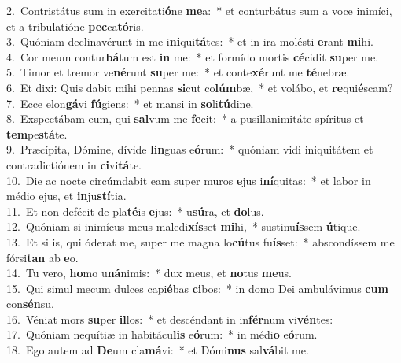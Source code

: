 {2.~}Contristátus sum in exercitati\textbf{ó}ne \textbf{me}a:~* et conturbátus sum a voce inimíci, et a tribulatióne \textbf{pec}ca\textbf{tó}ris.\\
{3.~}Quóniam declinavérunt in me i\textbf{ni}qui\textbf{tá}tes:~* et in ira molésti \textbf{e}rant \textbf{mi}hi.\\
{4.~}Cor meum contur\textbf{bá}tum est \textbf{in} me:~* et formído mortis \textbf{cé}cidit \textbf{su}per me.\\
{5.~}Timor et tremor ve\textbf{né}runt \textbf{su}per me:~* et conte\textbf{xé}runt me \textbf{té}nebræ.\\
{6.~}Et dixi: Quis dabit mihi pennas \textbf{si}cut co\textbf{lúm}bæ,~* et volábo, et \textbf{re}qui\textbf{é}scam?\\
{7.~}Ecce elon\textbf{gá}vi \textbf{fú}giens:~* et mansi in \textbf{so}li\textbf{tú}dine.\\
{8.~}Exspectábam eum, qui \textbf{sal}vum me \textbf{fe}cit:~* a pusillanimitáte spíritus et \textbf{tem}pe\textbf{stá}te.\\
{9.~}Præcípita, Dómine, dívide \textbf{lin}guas e\textbf{ó}rum:~* quóniam vidi iniquitátem et contradictiónem in \textbf{ci}vi\textbf{tá}te.\\
{10.~}Die ac nocte circúmdabit eam super muros \textbf{e}jus i\textbf{ní}quitas:~* et labor in médio ejus, et \textbf{in}ju\textbf{stí}tia.\\
{11.~}Et non defécit de pla\textbf{té}is \textbf{e}jus:~* u\textbf{sú}ra, et \textbf{do}lus.\\
{12.~}Quóniam si inimícus meus maledi\textbf{xís}set \textbf{mi}hi,~* sustinu\textbf{ís}sem \textbf{ú}tique.\\
{13.~}Et si is, qui óderat me, super me magna lo\textbf{cú}tus fu\textbf{ís}set:~* abscondíssem me fórsi\textbf{tan} ab \textbf{e}o.\\
{14.~}Tu vero, \textbf{ho}mo u\textbf{ná}nimis:~* dux meus, et \textbf{no}tus \textbf{me}us.\\
{15.~}Qui simul mecum dulces capi\textbf{é}bas \textbf{ci}bos:~* in domo Dei ambulávimus \textbf{cum} con\textbf{sén}su.\\
{16.~}Véniat mors \textbf{su}per \textbf{il}los:~* et descéndant in in\textbf{fér}num vi\textbf{vén}tes:\\
{17.~}Quóniam nequítiæ in habitácu\textbf{lis} e\textbf{ó}rum:~* in médi\textbf{o} e\textbf{ó}rum.\\
{18.~}Ego autem ad \textbf{De}um cla\textbf{má}vi:~* et Dómi\textbf{nus} sal\textbf{vá}bit me.\\
